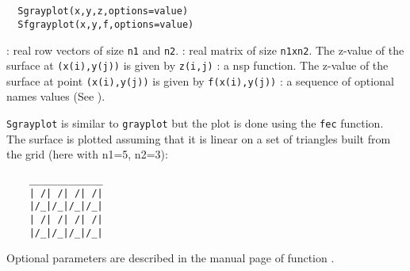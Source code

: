 \begin{mandesc}
  \\
  \\
\end{mandesc}
\begin{calling_sequence}
\begin{verbatim}
  Sgrayplot(x,y,z,options=value)
  Sfgrayplot(x,y,f,options=value)
\end{verbatim}
\end{calling_sequence}
\begin{parameters}
  \begin{varlist}
    : real row vectors of size \verb!n1! and \verb!n2!.
    : real matrix of size \verb!n1xn2!.
    The z-value of the surface at \verb!(x(i),y(j))! is given by \verb!z(i,j)!
    : a nsp function. The z-value of the surface at point \verb!(x(i),y(j))!
    is given by \verb!f(x(i),y(j))!
    : a sequence of optional names values (See ).
  \end{varlist}
\end{parameters}

\begin{mandescription}
  \verb!Sgrayplot! is similar to \verb!grayplot! but the plot is done using the
  \verb!fec! function. The surface is plotted assuming that it is linear on a set of
  triangles built from the grid (here with n1=5, n2=3):
  \begin{Verbatim}
    _____________
    | /| /| /| /|
    |/_|/_|/_|/_|
    | /| /| /| /|
    |/_|/_|/_|/_|
  \end{Verbatim}
  Optional parameters are described in the manual page of function .
\end{mandescription}

